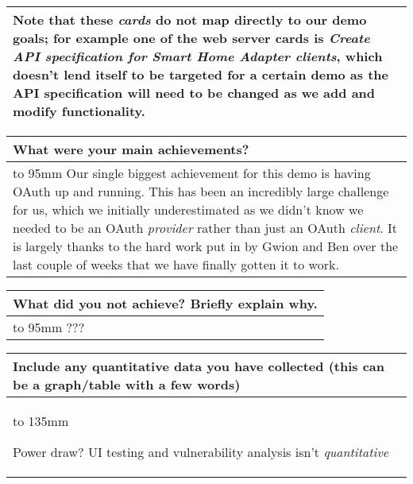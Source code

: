 \documentclass[a4paper]{article}
\newcommand{\colWidth}{141mm}
\begin{document}
\begin{center}
\begin{tabular}{|p{\colWidth}|}
		\vspace{3mm}

		Note that these \textit{cards} do not map directly to our demo goals; for example one of the web server cards is \textit{Create API specification for Smart Home Adapter clients},
		which doesn't lend itself to be targeted for a certain demo as the API specification will need to be changed as we add and modify functionality.
	
  \\
  \hline
\end{tabular}
\vskip 5mm


\begin{tabular}{|p{\colWidth}|}
	\hline
	\cellcolor{blue!25}\large
	\textbf{What were your main achievements?}
	\\ \hline
	\vtop to 95mm{
		Our single biggest achievement for this demo is having OAuth up and running.
		This has been an incredibly large challenge for us, which we initially underestimated as we didn't know we
		needed to be an OAuth \textit{provider} rather than just an OAuth \textit{client}.
		It is largely thanks to the hard work put in by Gwion and Ben over the last couple of weeks that
		we have finally gotten it to work.
	}
  \\
  \hline
\end{tabular}
\vskip 5mm


\begin{tabular}{|p{\colWidth}|}
	\hline
	\cellcolor{blue!25}\large
	\textbf{What did you not achieve? Briefly explain why.}
	\\ \hline
	\vtop to 95mm{
		\color{red} ???
  }
  \\
  \hline
\end{tabular}
\vskip 5mm


\begin{tabular}{|p{\colWidth}|}
	\hline
	\cellcolor{blue!25}\large
	\textbf{Include any quantitative data you have collected (this can be a graph/table with a few words)}
	\\ \hline
	\vtop to 135mm{
		\color{red} Power draw? UI testing and vulnerability analysis isn't \textit{quantitative}

  }
  \\
  \hline
\end{tabular}
\vskip 5mm


\end{center}
\end{document}
